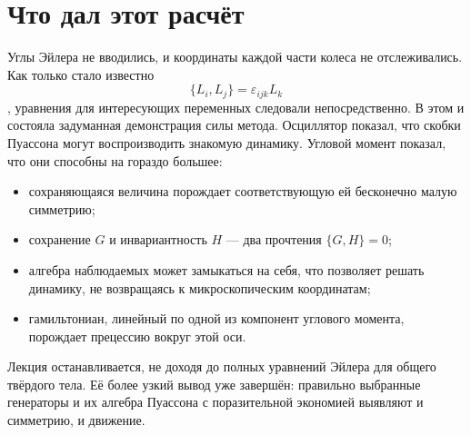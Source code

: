 \section{Что дал этот расчёт}

Углы Эйлера не вводились, и координаты каждой части колеса не отслеживались. Как только стало известно
\[
  \{L_i,L_j\}=\varepsilon_{ijk}L_k
\]
, уравнения для интересующих переменных следовали непосредственно.
В этом и состояла задуманная демонстрация силы метода. Осциллятор показал, что скобки Пуассона могут воспроизводить знакомую динамику. Угловой момент показал, что они способны на гораздо большее:
\begin{itemize}
  \item сохраняющаяся величина порождает соответствующую ей бесконечно малую симметрию;
  \item сохранение \(G\) и инвариантность \(H\) — два прочтения \(\{G,H\}=0\);
  \item алгебра наблюдаемых может замыкаться на себя, что позволяет решать динамику, не возвращаясь к микроскопическим координатам;
  \item гамильтониан, линейный по одной из компонент углового момента, порождает прецессию вокруг этой оси.
\end{itemize}
Лекция останавливается, не доходя до полных уравнений Эйлера для общего твёрдого тела. Её более узкий вывод уже завершён: правильно выбранные генераторы и их алгебра Пуассона с поразительной экономией выявляют и симметрию, и движение.